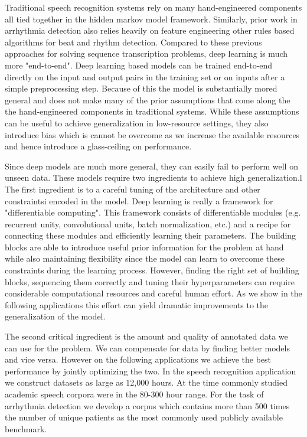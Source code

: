 Traditional speech recognition systems rely on many hand-engineered components
all tied together in the hidden markov model framework. Similarly, prior work
in arrhythmia detection also relies heavily on feature engineering other rules
based algorithms for beat and rhythm detection. Compared to these previous
approaches for solving sequence transcription problems, deep learning is much
more "end-to-end". Deep learning based models can be trained end-to-end
directly on the input and output pairs in the training set or on inputs after a
simple preprocessing step. Because of this the model is substantially mored
general and does not make many of the prior assumptions that come along the the
hand-engineered components in traditional systems. While these assumptions can
be useful to achieve generalization in low-resource settings, they also
introduce bias which is cannot be overcome as we increase the available
resources and hence introduce a glass-ceiling on performance.

Since deep models are much more general, they can easily fail to perform well
on unseen data. These models require two ingredients to achieve high
generalization.l The first ingredient is to a careful tuning of the
architecture and other constraintsi encoded in the model. Deep learning is
really a framework for "differentiable computing". This framework consists of
differentiable modules (e.g. recurrent unity, convolutional units, batch
normalization, etc.) and a recipe for connecting these modules and efficiently
learning their parameters. The building blocks are able to introduce useful
prior information for the problem at hand while also maintaining flexibility
since the model can learn to overcome these constraints during the learning
process. However, finding the right set of building blocks, sequencing them
correctly and tuning their hyperparameters can require considerable
computational resources and careful human effort. As we show in the following
applications this effort can yield dramatic improvements to the generalization
of the model.

The second critical ingredient is the amount and quality of annotated data we
can use for the problem. We can compensate for data by finding better models
and vice versa. However on the following applications we achieve the best
performance by jointly optimizing the two. In the speech recognition
application we construct datasets as large as 12,000 hours. At the time
commonly studied academic speech corpora were in the 80-300 hour range. For the
task of arrhythmia detection we develop a corpus which contains more than 500
times the number of unique patients as the most commonly used publicly
available benchmark.

